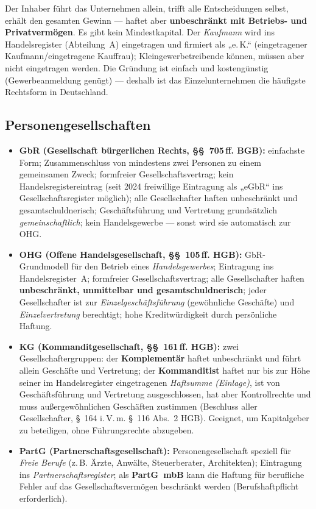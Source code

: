 \documentclass[11pt, a4paper]{article}
\begin{document}
Der Inhaber führt das Unternehmen allein, trifft alle Entscheidungen selbst, erhält den
gesamten Gewinn --- haftet aber \textbf{unbeschränkt mit Betriebs- und Privatvermögen}.
Es gibt kein Mindestkapital. Der \emph{Kaufmann} wird ins Handelsregister (Abteilung~A)
eingetragen und firmiert als „e.\,K.`` (eingetragener Kaufmann/eingetragene Kauffrau);
Kleingewerbetreibende können, müssen aber nicht eingetragen werden. Die Gründung ist
einfach und kostengünstig (Gewerbeanmeldung genügt) --- deshalb ist das Einzelunternehmen
die häufigste Rechtsform in Deutschland.

\subsection{Personengesellschaften}

\begin{itemize}
  \item \textbf{GbR (Gesellschaft bürgerlichen Rechts, §§~705\,ff. BGB):} einfachste Form;
    Zusammenschluss von mindestens zwei Personen zu einem gemeinsamen Zweck; formfreier
    Gesellschaftsvertrag; kein Handelsregistereintrag (seit 2024 freiwillige Eintragung
    als „eGbR`` ins Gesellschaftsregister möglich); alle Gesellschafter haften
    unbeschränkt und gesamtschuldnerisch; Geschäftsführung und Vertretung grundsätzlich
    \emph{gemeinschaftlich}; kein Handelsgewerbe --- sonst wird sie automatisch zur OHG.
  \item \textbf{OHG (Offene Handelsgesellschaft, §§~105\,ff. HGB):} GbR-Grundmodell für
    den Betrieb eines \emph{Handelsgewerbes}; Eintragung ins Handelsregister~A;
    formfreier Gesellschaftsvertrag; alle Gesellschafter haften \textbf{unbeschränkt,
    unmittelbar und gesamtschuldnerisch}; jeder Gesellschafter ist zur
    \emph{Einzelgeschäftsführung} (gewöhnliche Geschäfte) und \emph{Einzelvertretung}
    berechtigt; hohe Kreditwürdigkeit durch persönliche Haftung.
  \item \textbf{KG (Kommanditgesellschaft, §§~161\,ff. HGB):} zwei Gesellschaftergruppen:
    der \textbf{Komplementär} haftet unbeschränkt und führt allein Geschäfte und
    Vertretung; der \textbf{Kommanditist} haftet nur bis zur Höhe seiner im
    Handelsregister eingetragenen \emph{Haftsumme (Einlage)}, ist von Geschäftsführung
    und Vertretung ausgeschlossen, hat aber Kontrollrechte und muss außergewöhnlichen
    Geschäften zustimmen (Beschluss aller Gesellschafter, §~164 i.\,V.\,m. §~116 Abs.~2 HGB). Geeignet, um Kapitalgeber zu beteiligen, ohne
    Führungsrechte abzugeben.
  \item \textbf{PartG (Partnerschaftsgesellschaft):} Personengesellschaft speziell für
    \emph{Freie Berufe} (z.\,B. Ärzte, Anwälte, Steuerberater, Architekten); Eintragung
    ins \emph{Partnerschaftsregister}; als \textbf{PartG~mbB} kann die Haftung für
    berufliche Fehler auf das Gesellschaftsvermögen beschränkt werden
    (Berufshaftpflicht erforderlich).
\end{itemize}
\end{document}
